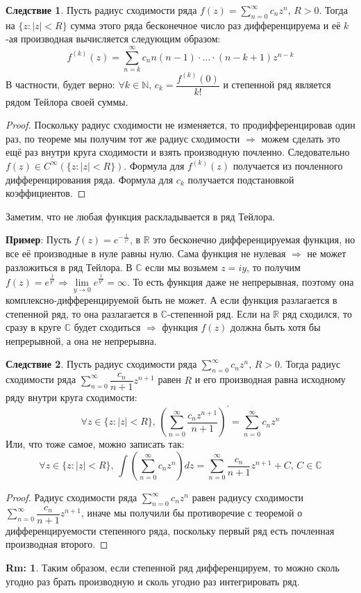 \documentclass[12pt]{article}
\newcommand{\MR}{\mathbb{R}}
\newcommand{\MC}{\mathbb{C}}
\newcommand{\MN}{\mathbb{N}}
\theoremstyle{definition}
\newtheorem{rem}{Rm:}
\newtheorem{corollary}{Следствие}
\newcommand{\ddsum}[2]{\displaystyle\sum\limits_{#1}^{#2}}
\begin{document}
\begin{corollary}
	Пусть радиус сходимости ряда $f(z) = \ddsum{n = 0}{\infty}c_n z^n$, $R > 0$. Тогда на $\{z \colon |z| < R \}$ сумма этого ряда бесконечное число раз дифференцируема и её $k$-ая производная вычисляется следующим образом:
	$$
		f^{(k)}(z) = \ddsum{ n = k}{\infty}c_n n(n - 1){\cdot}\dotsc {\cdot}(n - k + 1)z^{n - k}
	$$
	В частности, будет верно: $\forall k \in \MN, \, c_k = \dfrac{f^{(k)}(0)}{k!}$
	и степенной ряд является рядом Тейлора своей суммы.
\end{corollary}
\begin{proof}
	Поскольку радиус сходимости не изменяется, то продифференцировав один раз, по теореме мы получим тот же радиус сходимости $\Rightarrow$ можем сделать это ещё раз внутри круга сходимости и взять производную почленно. Следовательно $f(z) \in C^{\infty}\left(\{z \colon |z| < R\}\right)$.  Формула для $f^{(k)}(z)$ получается из почленного дифференцирования ряда. Формула для $c_k$ получается подстановкой коэффициентов. 
\end{proof}

Заметим, что не любая функция раскладывается в ряд Тейлора.

\textbf{Пример}: Пусть $f(z) = e^{-\tfrac{1}{z^2}}$, в $\MR$ это бесконечно дифференцируемая функция, но все её производные в нуле равны нулю. Сама функция не нулевая $\Rightarrow$ не может разложиться в ряд Тейлора. В $\MC$ если мы возьмем $z = iy$, то получим $f(z) = e^{\tfrac{1}{y^2}} \Rightarrow \lim\limits_{y \to 0}e^{\tfrac{1}{y^2}} = \infty$. То есть функция даже не непрерывная, поэтому она комплексно-дифференцируемой быть не может. А если функция разлагается в степенной ряд, то она разлагается в $\MC$-степенной ряд. Если на $\MR$  ряд сходился, то сразу в круге $\MC$ будет сходиться $\Rightarrow$ функция $f(z)$ должна быть хотя бы непрерывной, а она не непрерывна.

\begin{corollary}
	Пусть радиус сходимости ряда $\ddsum{n = 0}{\infty}c_n z^n$, $R > 0$. Тогда радиус сходимости ряда $\ddsum{n = 0}{\infty}\dfrac{c_n}{n+ 1}z^{n+1}$
	равен $R$ и его производная равна исходному ряду внутри круга сходимости:
	$$
		\forall z \in \{z \colon |z| < R\},\, \left(\ddsum{n = 0}{\infty}\dfrac{c_n z^{n+1}}{n + 1}\right)^\prime = \ddsum{n = 0}{\infty}c_n z^n
	$$
	Или, что тоже самое, можно записать так:
	$$
		\forall z \in \{z \colon |z| < R\}, \, \int \left(\ddsum{n = 0}{\infty}c_n z^n \right)dz = \ddsum{n = 0}{\infty}\dfrac{c_n }{n + 1}z^{n+1} + C, \, C \in \MC
	$$
\end{corollary}
\begin{proof}
	Радиус сходимости ряда $\ddsum{n = 0}{\infty}c_n z^n$ равен радиусу сходимости $\ddsum{n = 0}{\infty}\dfrac{c_n}{n+ 1}z^{n+1}$, иначе мы получили бы противоречие с теоремой о дифференцируемости степенного ряда, поскольку первый ряд есть почленная производная второго.
\end{proof}
\begin{rem}
	Таким образом, если степенной ряд дифференцируем, то можно сколь угодно раз брать производную и сколь угодно раз интегрировать ряд.
\end{rem}
\end{document}
